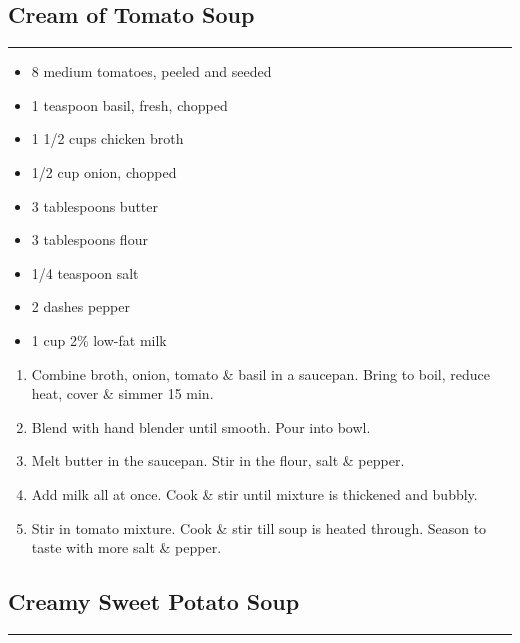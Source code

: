 \documentclass{article}
\begin{document}
\subsection{Cream of Tomato Soup} 
\noindent\rule[0.5ex]{\linewidth}{1pt}

\begin{framed}
\begin{itemize}
    \item 8 medium tomatoes, peeled and seeded
    \item 1 teaspoon basil, fresh, chopped
    \item 1 1/2 cups chicken broth
    \item 1/2 cup onion, chopped
    \item 3 tablespoons butter
    \item 3 tablespoons flour
    \item 1/4 teaspoon salt
    \item 2 dashes pepper
    \item 1 cup 2\% low-fat milk
\end{itemize}
\end{framed}

\begin{enumerate}
    \item 
        Combine broth, onion, tomato \& basil in a saucepan. Bring to boil, reduce heat, cover \& simmer 15 min.
    \item 
        Blend with hand blender until smooth. Pour into bowl.
    \item
        Melt butter in the saucepan. Stir in the flour, salt \& pepper.
    \item 
        Add milk all at once. Cook \& stir until mixture is thickened and bubbly.
    \item 
        Stir in tomato mixture. Cook \& stir till soup is heated through. Season to taste with more salt \& pepper.
\end{enumerate}
\newpage

\subsection{Creamy Sweet Potato Soup} 
\noindent\rule[0.5ex]{\linewidth}{1pt}
\end{document}
